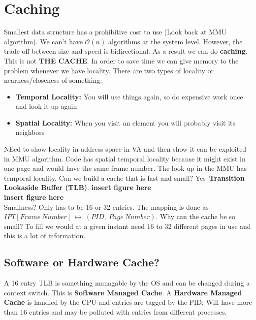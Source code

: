 \documentclass[../base_file/cs1550_notes.tex]{subfiles}
\begin{document}
\section{Caching}
Smallest data structure has a prohibitive cost to use (Look back at MMU algorithm). We can't have $\mathcal{O}(n)$
algorithms at the system level.  However, the trade off between size and speed is bidirectional.  As a result we can
do \textbf{caching}.  This is not \textbf{THE CACHE}.  In order to save time we can give memory to the problem whenever we
have locality.  There are two types of locality or nearness/closeness of something:
\begin{itemize}
	\item \textbf{Temporal Locality:} You will use things again, so do expensive work once and look it up again
	\item \textbf{Spatial Locality:} When you visit an element you will probably visit its neighbors
\end{itemize}
NEed to show locality in address space in VA and then show it can be exploited in MMU algorithm.  Code has spatial
temporal locality because it might exist in one page and would have the same frame number. The look up in the MMU
has temporal locality.  Can we build a cache that is fast and small? Yes--\textbf{Transition Lookaside Buffer (TLB)}.
\textbf{insert figure here}\\
\textbf{insert figure here}\\
Smallness?  Only has to be 16 or 32 entries. The mapping is done as $IPT[Frame\ Number]\ \longmapsto\ (PID,\ Page\ Number)$.
Why can the cache be so small?  To fill we would at a given instant need 16 to 32 different pages in use and this is a lot
of information.
\subsection{Software or Hardware Cache?}
A 16 entry TLB is something managable by the OS and can be changed during a context switch.  This is \textbf{Software Managed
Cache}.  A \textbf{Hardware Managed Cache} is handled by the CPU and entries are tagged by the PID\@.  Will have more than 16
entries and may be polluted with entries from different processes.
\end{document}
